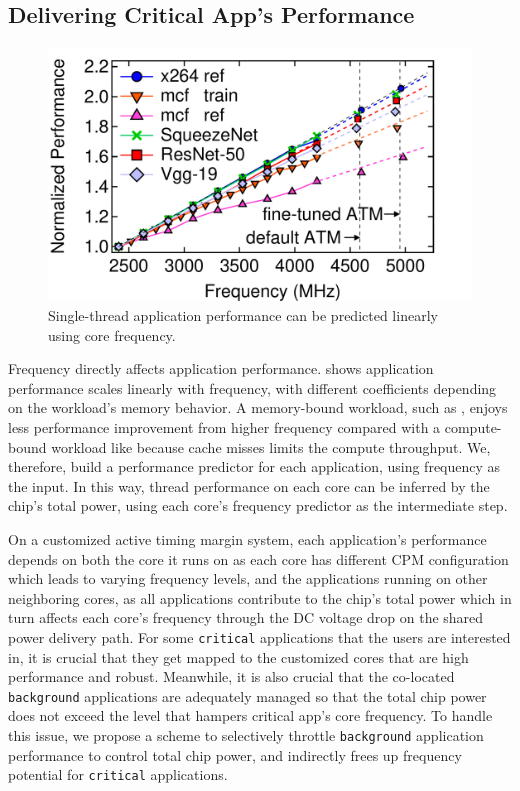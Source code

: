 \subsection{Delivering Critical App's Performance}
\label{sec:process:schedule:framework}

\begin{figure}
  \centering
      \includegraphics[trim=0 0 0 0,clip,width=.7\linewidth]{graphs/process/perf-pred.pdf}
      \captionsetup{width=.9\linewidth}
      \caption{Single-thread application performance can be predicted linearly using core frequency.}
\label{fig:1t-perf-pred}
\end{figure}

Frequency directly affects application performance.  shows application performance scales linearly with frequency, with different coefficients depending on the workload's memory behavior. A memory-bound workload, such as , enjoys less performance improvement from higher frequency compared with a compute-bound workload like  because cache misses limits the compute throughput. We, therefore, build a performance predictor for each application, using frequency as the input. In this way, thread performance on each core can be inferred by the chip's total power, using each core's frequency predictor as the intermediate step.

On a customized active timing margin system, each application's performance depends on both the core it runs on as each core has different CPM configuration which leads to varying frequency levels, and the applications running on other neighboring cores, as all applications contribute to the chip's total power which in turn affects each core's frequency through the DC voltage drop on the shared power delivery path. For some \texttt{critical} applications that the users are interested in, it is crucial that they get mapped to the customized cores that are high performance and robust. Meanwhile, it is also crucial that the co-located \texttt{background} applications are adequately managed so that the total chip power does not exceed the level that hampers critical app's core frequency. To handle this issue, we propose a scheme to selectively throttle \texttt{background} application performance to control total chip power, and indirectly frees up frequency potential for \texttt{critical} applications.

